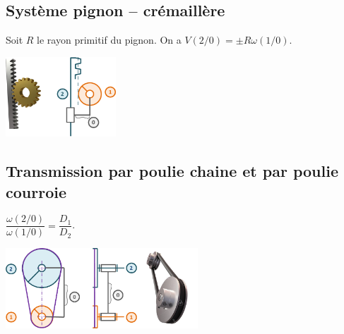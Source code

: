 \subsection*{Système pignon -- crémaillère}
\begin{minipage}[c]{.4\linewidth}
\begin{resultat}
Soit $R$ le rayon primitif du pignon. On a $V(2/0) = \pm R \omega(1/0)$.
\end{resultat}
\end{minipage}\hfill
\begin{minipage}[c]{.6\linewidth}
\begin{center}
\includegraphics[height=3cm]{images/fig_03.png}
\end{center}
\end{minipage}

\subsection*{Transmission par poulie chaine et par poulie courroie}
\begin{minipage}[c]{.4\linewidth}
\begin{resultat}

$\dfrac{\omega(2/0)}{\omega(1/0)} = \dfrac{D_1}{D_2}$.
\end{resultat}
\end{minipage}\hfill
\begin{minipage}[c]{.6\linewidth}
\begin{center}
\includegraphics[height=3cm]{images/fig_07.png}
\end{center}
\end{minipage}

